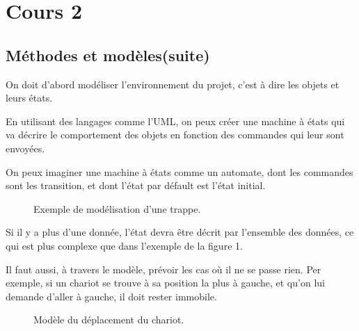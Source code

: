 \section{Cours 2}
\subsection{Méthodes et modèles(suite)}

On doit d'abord modéliser l'environnement du projet, c'est à dire les objets et leurs états.

En utilisant des langages comme l'UML, on peux créer une machine à états qui va décrire le comportement
des objets en fonction des commandes qui leur sont envoyées.

On peux imaginer une machine à états comme un automate, dont les commandes sont les transition,
et dont l'état par défault est l'état initial.\\
\begin{figure}[ht]
	\centering
	\caption{Exemple de modélisation d'une trappe.}
\end{figure}

Si il y a plus d'une donnée, l'état devra être décrit par l'ensemble des données, ce qui est plus complexe
que dans l'exemple de la figure 1.

Il faut aussi, à travers le modèle, prévoir les cas où il ne se passe rien. Per exemple, si un chariot se trouve à
sa position la plus à gauche, et qu'on lui demande d'aller à gauche, il doit rester immobile.
\begin{figure}[ht]
	\centering
	\caption{Modèle du déplacement du chariot.}
\end{figure}
\newpage

